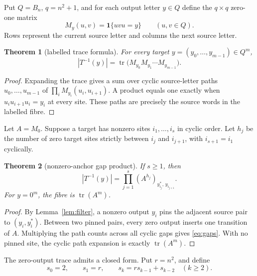 \documentclass[a4paper,10pt]{amsart}
\newtheorem{theorem}{Theorem}[section]
\theoremstyle{remark}
\newcommand{\Bn}{B_n}
\newcommand{\tr}{\operatorname{tr}}
\begin{document}
Put $Q=\Bn$, $q=n^2+1$, and for each output letter $y\in Q$ define the
$q\times q$ zero-one matrix
\begin{equation}\label{eq:matrix}
 M_y(u,v)=\boldsymbol{1}\{uvu=y\}\qquad(u,v\in Q).
\end{equation}
Rows represent the current source letter and columns the next source letter.

\begin{theorem}[labelled trace formula]\label{thm:trace}
For every target $y=(y_0,\ldots,y_{m-1})\in Q^m$,
\begin{equation}\label{eq:trace}
 |T^{-1}(y)|=\tr\bigl(M_{y_0}M_{y_1}\cdots M_{y_{m-1}}\bigr).
\end{equation}
\end{theorem}

\begin{proof}
Expanding the trace gives a sum over cyclic source-letter paths
$u_0,\ldots,u_{m-1}$ of
$\prod_i M_{y_i}(u_i,u_{i+1})$.  A product equals one exactly when
$u_i u_{i+1}u_i=y_i$ at every site.  These paths are precisely the source
words in the labelled fibre.
\end{proof}

Let $A=M_0$.  Suppose a target has nonzero sites
$i_1,\ldots,i_s$ in cyclic order.  Let $h_j$ be the number of zero target
sites strictly between $i_j$ and $i_{j+1}$, with $i_{s+1}=i_1$ cyclically.

\begin{theorem}[nonzero-anchor gap product]\label{thm:gaps}
If $s\geq1$, then
\begin{equation}\label{eq:gaps}
 |T^{-1}(y)|=\prod_{j=1}^s
 (A^{h_j})_{y_{i_j}^*,\,y_{i_{j+1}}}.
\end{equation}
For $y=0^m$, the fibre is $\tr(A^m)$.
\end{theorem}

\begin{proof}
By Lemma~\ref{lem:filter}, a nonzero output $y_i$ pins the adjacent source
pair to $(y_i,y_i^*)$.  Between two pinned pairs, every zero output inserts
one transition of $A$.  Multiplying the path counts across all cyclic gaps
gives \eqref{eq:gaps}.  With no pinned site, the cyclic path expansion is
exactly $\tr(A^m)$.
\end{proof}

The zero-output trace admits a closed form.  Put $r=n^2$, and define
\begin{equation}\label{eq:recurrence}
 s_0=2,\qquad s_1=r,\qquad s_k=r s_{k-1}+s_{k-2}\quad(k\geq2).
\end{equation}
\end{document}

